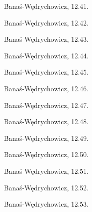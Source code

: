 \begin{integral}
    Banaś-Wędrychowicz, 12.41.
\end{integral}

\begin{integral}
    Banaś-Wędrychowicz, 12.42.
\end{integral}

\begin{integral}
    Banaś-Wędrychowicz, 12.43.
\end{integral}

\begin{integral}
    Banaś-Wędrychowicz, 12.44.
\end{integral}

\begin{integral}
    Banaś-Wędrychowicz, 12.45.
\end{integral}

\begin{integral}
    Banaś-Wędrychowicz, 12.46.
\end{integral}

\begin{integral}
    Banaś-Wędrychowicz, 12.47.
\end{integral}

\begin{integral}
    Banaś-Wędrychowicz, 12.48.
\end{integral}

\begin{integral}
    Banaś-Wędrychowicz, 12.49.
\end{integral}

\begin{integral}
    Banaś-Wędrychowicz, 12.50.
\end{integral}

\begin{integral}
    Banaś-Wędrychowicz, 12.51.
\end{integral}

\begin{integral}
    Banaś-Wędrychowicz, 12.52.
\end{integral}

\begin{integral}
    Banaś-Wędrychowicz, 12.53.
\end{integral}

